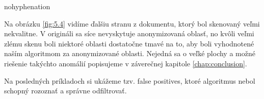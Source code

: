 \begin{hyphenrules}{nohyphenation}
\begin{figure}[H]
\begin{minipage}[b]{.4\linewidth}
\end{minipage}
\end{figure}

Na obrázku \ref{fig:5.4} vidíme ďalšiu stranu z dokumentu, ktorý bol skenovaný veľmi nekvalitne. V origináli sa síce nevyskytuje anonymizovaná oblasť, no kvôli veľmi zlému skenu boli niektoré oblasti dostatočne tmavé na to, aby boli vyhodnotené naším algoritmom za anonymizované oblasti. Nejedná sa o veľké plochy a možné riešenie takýchto anomálií popisujeme v záverečnej kapitole \ref{chap:conclusion}.
\newline

Na posledných príkladoch si ukážeme tzv. false positives, ktoré algoritmus nebol schopný rozoznať a správne odfiltrovať.


\end{hyphenrules}
